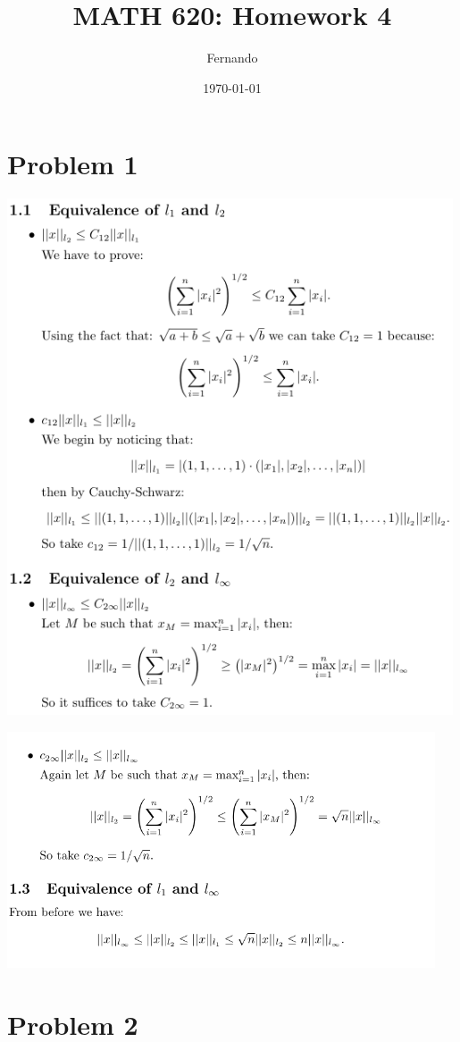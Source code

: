\documentclass{article}
\title{MATH 620: Homework 4}
\author{Fernando}
\date{\today}
\begin{document}
\maketitle
\section*{Problem 1}
\includegraphics[width=0.99\textwidth]{prob1Part1hw4.png}

\includegraphics[width=0.95\textwidth]{prob1Part2hw4.png}
\section*{Problem 2}
\end{document}
